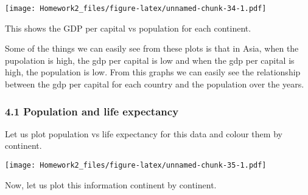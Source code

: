 \documentclass[]{article}
\newenvironment{Shaded}{\begin{snugshade}}{\end{snugshade}}
\newcommand{\KeywordTok}[1]{\textcolor[rgb]{0.13,0.29,0.53}{\textbf{{#1}}}}
\newcommand{\DataTypeTok}[1]{\textcolor[rgb]{0.13,0.29,0.53}{{#1}}}
\newcommand{\StringTok}[1]{\textcolor[rgb]{0.31,0.60,0.02}{{#1}}}
\newcommand{\CommentTok}[1]{\textcolor[rgb]{0.56,0.35,0.01}{\textit{{#1}}}}
\newcommand{\NormalTok}[1]{{#1}}
\begin{document}
\texttt{[image: Homework2\_files/figure-latex/unnamed-chunk-34-1.pdf]}

This shows the GDP per capital vs population for each continent.

Some of the things we can easily see from these plots is that in Asia,
when the pupolation is high, the gdp per capital is low and when the gdp
per capital is high, the population is low. From this graphs we can
easily see the relationship between the gdp per capital for each country
and the population over the years.

\subsubsection{4.1 Population and life
expectancy}\label{population-and-life-expectancy}

Let us plot population vs life expectancy for this data and colour them
by continent.

\begin{Shaded}
\end{Shaded}

\texttt{[image: Homework2\_files/figure-latex/unnamed-chunk-35-1.pdf]}

Now, let us plot this information continent by continent.

\begin{Shaded}
\end{Shaded}
\end{document}
